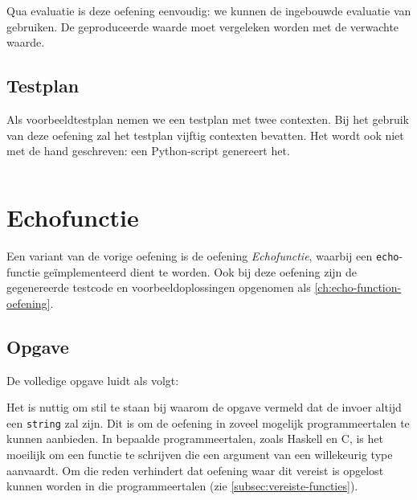 Qua evaluatie is deze oefening eenvoudig: we kunnen de ingebouwde evaluatie van \tested{} gebruiken.
De geproduceerde waarde moet vergeleken worden met de verwachte waarde.

\subsection{Testplan}\label{subsec:oefening-echo-testplan}

Als voorbeeldtestplan nemen we een testplan met twee contexten.
Bij het gebruik van deze oefening zal het testplan vijftig contexten bevatten.
Het wordt ook niet met de hand geschreven: een Python-script genereert het.

\inputminted{json}{sources/echo/two.tson}

\section{Echofunctie}\label{sec:oefening-echofunctie}

Een variant van de vorige oefening is de oefening \emph{Echofunctie}, waarbij een \texttt{echo}-functie geïmplementeerd dient te worden.
Ook bij deze oefening zijn de gegenereerde testcode en voorbeeldoplossingen opgenomen als \cref{ch:echo-function-oefening}.

\subsection{Opgave}\label{subsec:oefening-echofunctie-opgave}

De volledige opgave luidt als volgt:

\begin{quote}
\end{quote}

Het is nuttig om stil te staan bij waarom de opgave vermeld dat de invoer altijd een \texttt{string} zal zijn.
Dit is om de oefening in zoveel mogelijk programmeertalen te kunnen aanbieden.
In bepaalde programmeertalen, zoals Haskell en C, is het moeilijk om een functie te schrijven die een argument van een willekeurig type aanvaardt.
Om die reden verhindert \tested{} dat oefening waar dit vereist is opgelost kunnen worden in die programmeertalen (zie \cref{subsec:vereiste-functies}).

